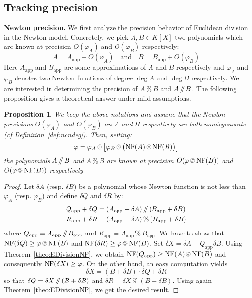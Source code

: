 \documentclass{sig-alternate-05-2015}
\newcommand{\NF}{\text{\rm NF}}
\renewcommand{\mod}{\,\%\,}
\renewcommand{\div}{\,/\hspace{-0.3em}/\,}
\newcommand{\nfop}[1]{%
\raisebox{-0.1mm}{\begin{tikzpicture}
\draw[transparent] (-0.18,0)--(0.18,0);
\draw[very thin] (0,0) circle (0.11cm);
\begin{scope}
\clip (0,0) circle (0.11cm);
\node[scale=0.75] at (0,0) { $#1$ };
\end{scope}
\end{tikzpicture}}}
\newcommand{\nfplus}{\nfop+}
\newcommand{\nftimes}{\nfop\times}
\newcommand{\nfmod}{\nfop\mod}
\newcommand{\nfdiv}{\nfop\div}
\newcommand{\app}{\textrm{app}}
\newtheorem{prop}[theo]{Proposition}
\theoremstyle{definition}
\begin{document}
\subsection{Tracking precision} \label{sec:prec_track}

\medskip

\noindent
{\bf Newton precision.}
We first analyze the precision behavior of Euclidean division
in the Newton model.  Concretely, we pick $A, B \in K[X]$ two polynomials which 
are known at precision $O(\varphi_A)$ and $O(\varphi_B)$ respectively:
$$A = A_\app + O(\varphi_A)
\quad \text{and} \quad
B = B_\app + O(\varphi_B)$$
Here $A_\app$ and $B_\app$ are some approximations of $A$ and $B$ respectively 
and $\varphi_A$ and $\varphi_B$ denotes two Newton functions of degree 
$\deg A$ and $\deg B$ respectively.
We are interested in determining the precision of $A \mod B$ and $A
\div B$. The following proposition gives a theoretical answer under
mild assumptions.

\begin{prop}
\label{prop:NewtonprecEuclide}
We keep the above notations and assume that the Newton precisions
$O(\varphi_A)$ and $O(\varphi_B)$ on $A$ and $B$ respectively are 
both nondegenerate (\emph{cf} Definition~\ref{def:nondeg}). Then,
setting:
$$\varphi = \varphi_A \nfplus 
\big[ \varphi_B \nftimes \big(\NF(A) \nfdiv \NF(B)\big) \big]$$
the polynomials $A \div B$ and $A \mod B$ are known at precision 
$O(\varphi \nfdiv \NF(B))$ and $O(\varphi \nfmod \NF(B))$ respectively.
\end{prop}

\begin{proof}
Let $\delta A$ (resp. $\delta B$) be a polynomial whose Newton 
function is not less than $\varphi_A$ (resp. $\varphi_B$) and define
$\delta Q$ and $\delta R$ by:
\begin{align*}
Q_\app + \delta Q & = (A_\app + \delta A) \div (B_\app + \delta B) \\
R_\app + \delta R & = (A_\app + \delta A) \mod (B_\app + \delta B)
\end{align*}
where $Q_\app = A_\app \div B_\app$ and $R_\app = A_\app \mod B_\app$.
We have to show that $\NF(\delta Q) \geq \varphi \nfdiv \NF(B)$ and
$\NF(\delta R) \geq \varphi \nfmod \NF(B)$.
Set $\delta X = \delta A - Q_\app \delta B$. 
Using Theorem~\ref{theo:EDivisionNP}, we obtain $\NF(Q_\app) \geq
\NF(A) \nfdiv \NF(B)$ and consequently $\NF(\delta X) \geq \varphi$.
On the other hand, an easy computation yields
$$\delta X = (B + \delta B) \cdot \delta Q + \delta R$$
so that $\delta Q = \delta X \div (B + \delta B)$ and 
$\delta R = \delta X \mod (B + \delta B)$. Using again 
Theorem~\ref{theo:EDivisionNP}, we get the desired result.
\end{proof}
\end{document}

